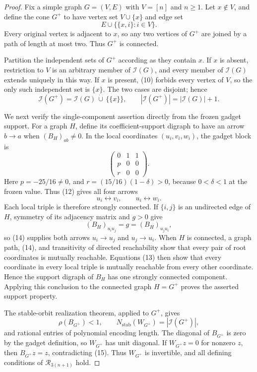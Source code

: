 \documentclass{article}
\begin{document}
\begin{proof}
Fix a simple graph \(G=(V,E)\) with \(V=[n]\) and \(n\geq1\). Let \(x\notin V\), and define the cone \(G^+\) to have vertex set \(V\cup\{x\}\) and edge set
\[
 E\cup\bigl\{\{x,i\}:i\in V\bigr\}. \tag{10}
\]
Every original vertex is adjacent to \(x\), so any two vertices of \(G^+\) are joined by a path of length at most two. Thus \(G^+\) is connected.

Partition the independent sets of \(G^+\) according as they contain \(x\). If \(x\) is absent, restriction to \(V\) is an arbitrary member of \(\mathcal I(G)\), and every member of \(\mathcal I(G)\) extends uniquely in this way. If \(x\) is present, (10) forbids every vertex of \(V\), so the only such independent set is \(\{x\}\). The two cases are disjoint; hence
\[
 \mathcal I(G^+)
 =\mathcal I(G)\,\dot\cup\,\bigl\{\{x\}\bigr\},
 \qquad
 |\mathcal I(G^+)|=|\mathcal I(G)|+1. \tag{11}
\]

We next verify the single-component assertion directly from the frozen gadget support. For a graph \(H\), define its coefficient-support digraph to have an arrow \(b\to a\) when \((B_H)_{ab}\neq0\). In the local coordinates \((u_i,v_i,w_i)\), the gadget block is
\[
 \begin{pmatrix}
 0&1&1\\
 p&0&0\\
 r&0&0
 \end{pmatrix}. \tag{12}
\]
Here \(p=-25/16\neq0\), and \(r=(15/16)(1-\delta)>0\), because \(0<\delta<1\) at the frozen value. Thus (12) gives all four arrows
\[
 u_i\longleftrightarrow v_i,
 \qquad
 u_i\longleftrightarrow w_i. \tag{13}
\]
Each local triple is therefore strongly connected. If \(\{i,j\}\) is an undirected edge of \(H\), symmetry of its adjacency matrix and \(g>0\) give
\[
 (B_H)_{u_i u_j}=g=(B_H)_{u_j u_i}, \tag{14}
\]
so (14) supplies both arrows \(u_i\to u_j\) and \(u_j\to u_i\). When \(H\) is connected, a graph path, (14), and transitivity of directed reachability show that every pair of root coordinates is mutually reachable. Equations (13) then show that every coordinate in every local triple is mutually reachable from every other coordinate. Hence the support digraph of \(B_H\) has one strongly connected component. Applying this conclusion to the connected graph \(H=G^+\) proves the asserted support property.

The stable-orbit realization theorem, applied to \(G^+\), gives
\[
 \rho(B_{G^+})<1,
 \qquad
 N_{\mathrm{stab}}(W_{G^+})
 =|\mathcal I(G^+)|, \tag{15}
\]
and rational entries of polynomial encoding length. The diagonal of \(B_{G^+}\) is zero by the gadget definition, so \(W_{G^+}\) has unit diagonal. If \(W_{G^+}z=0\) for nonzero \(z\), then \(B_{G^+}z=z\), contradicting (15). Thus \(W_{G^+}\) is invertible, and all defining conditions of \(\mathcal R_{3(n+1)}\) hold.


\end{proof}
\end{document}
